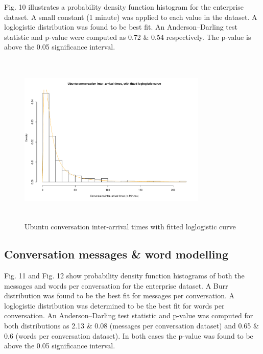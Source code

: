 \documentclass[conference]{IEEEtran}
\begin{document}
Fig. 10 illustrates a probability density function histogram for the enterprise dataset. A small constant (1 minute) was applied to each value in the dataset. A loglogistic distribution was found to be best fit. An Anderson--Darling test statistic and p-value were computed as 0.72 \& 0.54 respectively. The p-value is above the 0.05 significance interval. 

\begin{figure}
\begin{center}
\includegraphics[height=8.3cm, width=9cm]{10_interarrival_ubuntu.pdf} 
\caption{Ubuntu conversation inter-arrival times with fitted loglogistic curve}
\end{center}
\label{fig:interarrival_ubun}
\end{figure}

\subsection{Conversation messages \& word modelling}

Fig. 11 and Fig. 12 show probability density function histograms of both the messages and words per conversation for the enterprise dataset. 
 A Burr distribution was found to be the best fit for messages per conversation. A loglogistic distribution was determined to be the best fit for words per conversation.  An Anderson--Darling test statistic and p-value was computed for both distributions as 2.13 \& 0.08 (messages per conversation dataset) and 0.65 \& 0.6 (words per conversation dataset). In both cases the p-value was found to be above the 0.05 significance interval.
\end{document}
